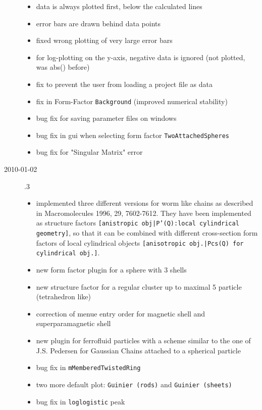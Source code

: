 \begin{description}
\begin{itemize}
            \item data is always plotted first, below the calculated lines
            \item error bars are drawn behind data points
            \item fixed wrong plotting of very large error bars
            \item for log-plotting on the y-axis, negative data is ignored (not plotted, was abs() before)
            \item fix to prevent the user from loading a \SASfit project file as data
            \item fix in Form-Factor \texttt{Background} (improved numerical stability)
            \item bug fix for saving parameter files on windows
            \item bug fix in gui when selecting form factor \texttt{TwoAttachedSpheres}
            \item bug fix for "Singular Matrix" error
        \end{itemize}
    \item[2010-01-02] .3
        \begin{itemize}
        \item implemented three different versions for worm like chains as
              described in Macromolecules 1996, 29, 7602-7612. They have
              been implemented as structure factors
              \texttt{[anistropic obj|P'(Q):local cylindrical geometry]},
              so that it can be combined with different cross-section
              form factors of local cylindrical objects
              \texttt{[anisotropic obj.|Pcs(Q) for cylindrical obj.]}.
        \item new form factor plugin for a sphere with 3 shells
        \item new structure factor for a regular cluster up to maximal 5 particle
              (tetrahedron like)
        \item correction of menue entry order for magnetic shell and
              superparamagnetic shell
        \item new plugin for ferrofluid particles with a scheme similar to
              the one of J.S. Pedersen for Gaussian Chains attached to a spherical particle
        \item bug fix in \texttt{mMemberedTwistedRing}
        \item two more default plot: \texttt{Guinier (rods)} and \texttt{Guinier (sheets)}
        \item bug fix in \texttt{loglogistic} peak

\end{itemize}
\end{description}
